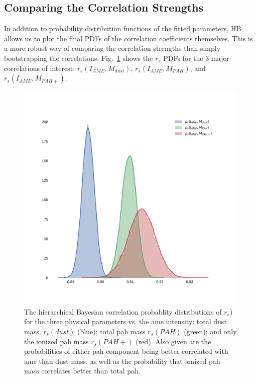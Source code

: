     \subsection{Comparing the Correlation Strengths}

    In addition to probability distribution functions of the fitted parameters, HB allows us to plot the final PDFs of the correlation coefficients themselves. This is a more robust way of comparing the correlation strengths than simply bootstrapping the correlations. Fig.~\ref{fig:PDFs_Iame} shows the $r_{s}$  PDFs for the 3 major correlations of interest: $r_{s}(I_{AME},M_{dust})$, $r_{s}(I_{AME},M_{PAH})$, and $r_{s}(I_{AME},M_{PAH+})$.
        \begin{figure}
          \includegraphics[width=\textwidth]{../Plots/ch_lori/PDFs_Iame.pdf}
          \centering
          \caption{ The hierarchical Bayesian correlation probablity distributions of $r_{s}$) for the three physical parameters vs. the \acrshort{ame} intensity: total dust mass, $r_{s}(dust)$ (blue); total \acrshort{pah} mass $r_{s}(PAH)$ (green); and only the ionized \acrshort{pah} mass $r_{s}(PAH+)$ (red). Also given are the probabilities of either \acrshort{pah} component being better correlated with \acrshort{ame} than dust mass, as well as the probability that ionized \acrshort{pah} mass correlates better than total \acrshort{pah}.}
          \label{fig:PDFs_Iame}
        \end{figure}
